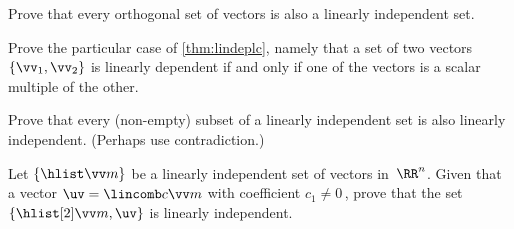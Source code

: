 \begin{exercise} 
Prove that every orthogonal set of vectors is also a linearly independent set.
\end{exercise}




\begin{exercise} \label{ex:lindeplc} 
Prove the particular case of \autoref{thm:lindeplc}, namely that a set of two vectors \(\{\vv_1,\vv_2\}\) is linearly dependent if and only if one of the vectors is a scalar multiple of the other.
\end{exercise}




\begin{exercise} \label{ex:} 
Prove that every (non-empty) subset of a linearly independent set is also linearly independent.  (Perhaps use contradiction.)
\end{exercise}





\begin{exercise} \label{ex:} 
Let \(\{\hlist\vv m\}\) be a linearly independent set of vectors in~\(\RR^n\).
Given that a vector \(\uv=\lincomb c\vv m\) with coefficient \(c_1\neq0\)\,, prove that the set \(\{\hlist[2]\vv m,\uv\}\) is linearly independent.
\end{exercise}




